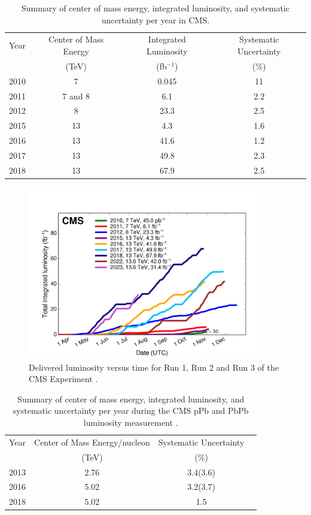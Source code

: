 \begin{table}[h]
  \centering
  \caption[Integrated luminosity and its precision for Run1 and Run2]{Summary of center of mass energy, integrated luminosity, and systematic uncertainty per year in CMS.}
\begin{tabular}{c c c c}
  Year & Center of Mass Energy & Integrated Luminosity & Systematic Uncertainty \\
  & (TeV) & (fb$^{-1}$) & (\%) \\
\hline
2010 & 7 & 0.045 & 11 \\
2011 & 7 and 8 & 6.1 & 2.2 \\
2012 & 8 & 23.3 & 2.5 \\
2015 & 13 & 4.3 & 1.6 \\
2016 & 13 & 41.6 & 1.2 \\
2017 & 13 & 49.8 & 2.3 \\
2018 & 13 & 67.9 &  2.5\\
\end{tabular}
\label{tab:lumi}
\end{table}


\begin{figure}[!htp]
\centering
\includegraphics[width=0.9\textwidth]{ashish_thesis/CMS_luminosity.png}
\caption[CMS Integrated luminosity]{%
    Delivered luminosity versus time for Run 1, Run 2 and Run 3 of the CMS Experiment \cite{wikicern_cc}.
}
\label{fig:lumi}
\end{figure}


\begin{table}[h]
  \centering
  \caption[Precision for Run1 and Run2]{Summary of center of mass energy, integrated luminosity, and systematic uncertainty per year during the CMS pPb and PbPb luminosity measurement \cite{CMS-PAS-LUM-13-002, CMS-PAS-LUM-17-002, CMS-PAS-LUM-18-001}.}
\begin{tabular}{c c c c}
  Year & Center of Mass Energy/nucleon & Systematic Uncertainty \\
  & (TeV) & (\%) \\
\hline
2013 & 2.76 & 3.4(3.6)  \\
2016 &  5.02  & 3.2(3.7)\\
2018 & 5.02 & 1.5 \\
\end{tabular}
\label{tab:lumi40}
\end{table}

